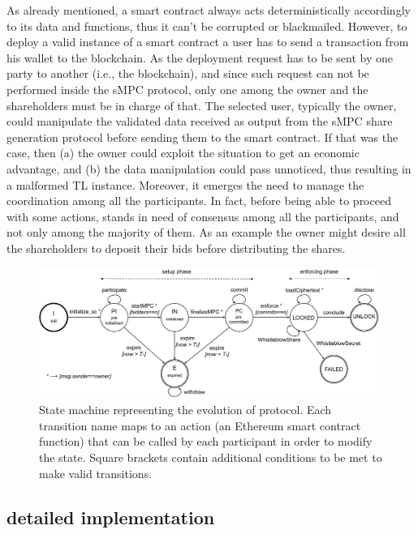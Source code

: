As already mentioned, a smart contract always acts deterministically accordingly to its data and functions, thus it can't be corrupted or blackmailed. 
However, to deploy a valid instance of a smart contract a user has to send a transaction from his wallet to the blockchain. 
As the deployment request has to be sent by one party to another (i.e., the blockchain), and since such request can not be performed inside the sMPC protocol, only one among the owner and the shareholders must be in charge of that.  
The selected user, typically the owner, could manipulate the validated data received as output from the sMPC share generation protocol before sending them to the smart contract.
If that was the case, then (a) the owner could exploit the situation to get an economic advantage, and (b) the data manipulation could pass unnoticed, thus resulting in a malformed TL instance.
\newline
Moreover, it emerges the need to manage the coordination among all the participants. 
In fact, before being able to proceed with some actions, \shortname stands in need of consensus among all the participants, and not only among the majority of them. 
As an example the owner might desire all the shareholders to deposit their bids before distributing the shares.

\begin{figure}[t]
	\centering
	\includegraphics[width=\textwidth]{fig/protocol_fsm_simple_version.pdf}
	\caption{State machine representing the evolution of \shortname protocol. Each transition name maps to an action (an Ethereum smart contract function) that can be called by each participant in order to modify the state. Square brackets contain additional conditions to be met to make valid transitions.}
	\label{fig:fsm}
\end{figure}

\subsection{\shortname detailed implementation}\label{sect:ityt_exec}
 
